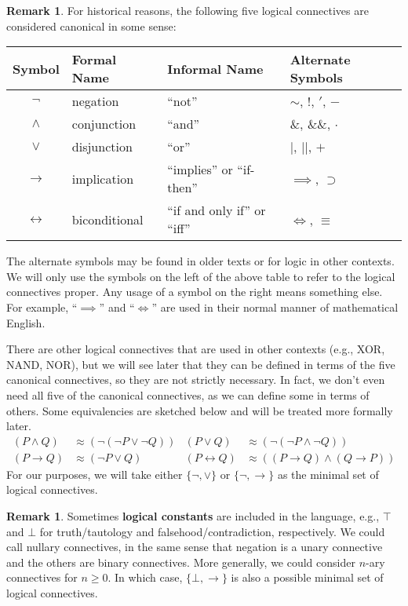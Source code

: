 \documentclass[12pt]{article}
\theoremstyle{definition}
\newtheorem{remark}[theorem]{Remark}
\newcommand{\<}{\langle}
\renewcommand{\>}{\rangle}
\newcommand{\keyword}{\textbf}
\newcommand{\liff}{\leftrightarrow}
\begin{document}
\begin{remark}
    For historical reasons, the following five logical connectives are considered canonical in some sense:
    \begin{center}
        \begin{tabular}{clll}
            Symbol & Formal Name & Informal Name & Alternate Symbols\\
            \hline
            $\lnot$ & negation & ``not'' & $\sim$, $!$, $'$, $-$ \\ 
            $\land$ & conjunction & ``and'' & $\&$, $\&\&$, $\cdot$ \\ 
            $\lor$ & disjunction & ``or'' & $|$, $||$, $+$ \\ 
            $\to$ & implication & ``implies'' or ``if-then'' & $\implies$, $\supset$ \\
            $\liff$ & biconditional & ``if and only if'' or ``iff'' & $\iff$, $\equiv$
        \end{tabular}
    \end{center}
    The alternate symbols may be found in older texts or for logic in other contexts.
    We will only use the symbols on the left of the above table to refer to the logical connectives proper.
    Any usage of a symbol on the right means something else.
    For example, ``$\implies$'' and ``$\iff$'' are used in their normal manner of mathematical English.

    There are other logical connectives that are used in other contexts (e.g., XOR, NAND, NOR), but we will see later that they can be defined in terms of the five canonical connectives, so they are not strictly necessary.
    In fact, we don't even need all five of the canonical connectives, as we can define some in terms of others.
    Some equivalencies are sketched below and will be treated more formally later.
    \begin{align*}
        (P \land Q) &\approx (\lnot(\lnot P \lor \lnot Q))
            & (P \lor Q) &\approx (\lnot(\lnot P \land \lnot Q)) \\
        (P \to Q) &\approx (\lnot P \lor Q)
            & (P \liff Q) &\approx ((P \to Q) \land (Q \to P))
    \end{align*}
    For our purposes, we will take either $\{\lnot, \lor\}$ or $\{\lnot, \to\}$ as the minimal set of logical connectives.
\end{remark}

\begin{remark}
    Sometimes \keyword{logical constants} are included in the language, e.g., $\top$ and $\bot$ for truth/tautology and falsehood/contradiction, respectively.
    We could call nullary connectives, in the same sense that negation is a unary connective and the others are binary connectives.
    More generally, we could consider $n$-ary connectives for $n \geq 0$.
    In which case, $\{\bot, \to\}$ is also a possible minimal set of logical connectives.
\end{remark}
\end{document}
